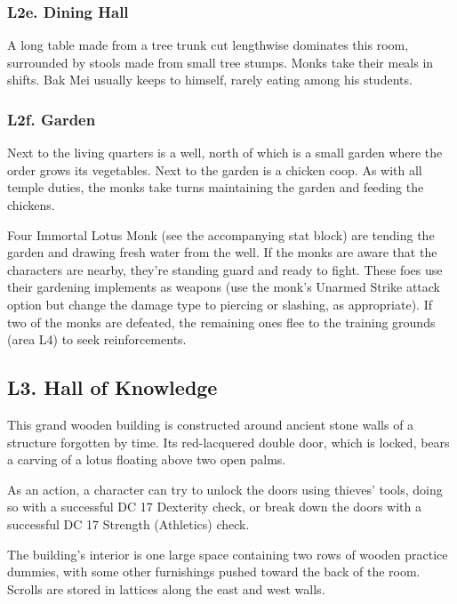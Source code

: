 \documentclass[10pt,a4paper,twoside,bg=print,twocolumn,openany,nodeprecatedcode]{dndbook}
\begin{document}
\subsubsection{L2e. Dining Hall}
A long table made from a tree trunk cut lengthwise dominates this room, surrounded by stools made from small tree stumps. Monks take their meals in shifts. Bak Mei usually keeps to himself, rarely eating among his students.

\subsubsection{L2f. Garden}
Next to the living quarters is a well, north of which is a small garden where the order grows its vegetables. Next to the garden is a chicken coop. As with all temple duties, the monks take turns maintaining the garden and feeding the chickens.

Four Immortal Lotus Monk (see the accompanying stat block) are tending the garden and drawing fresh water from the well. If the monks are aware that the characters are nearby, they're standing guard and ready to fight. These foes use their gardening implements as weapons (use the monk's Unarmed Strike attack option but change the damage type to piercing or slashing, as appropriate). If two of the monks are defeated, the remaining ones flee to the training grounds (area L4) to seek reinforcements.

\subsection{L3. Hall of Knowledge}
\begin{DndReadAloud}{}
This grand wooden building is constructed around ancient stone walls of a structure forgotten by time. Its red-lacquered double door, which is locked, bears a carving of a lotus floating above two open palms.

\end{DndReadAloud}

As an action, a character can try to unlock the doors using thieves' tools, doing so with a successful DC 17 Dexterity check, or break down the doors with a successful DC 17 Strength (Athletics) check.

\begin{DndReadAloud}{}
The building's interior is one large space containing two rows of wooden practice dummies, with some other furnishings pushed toward the back of the room. Scrolls are stored in lattices along the east and west walls.

\end{DndReadAloud}
\end{document}
